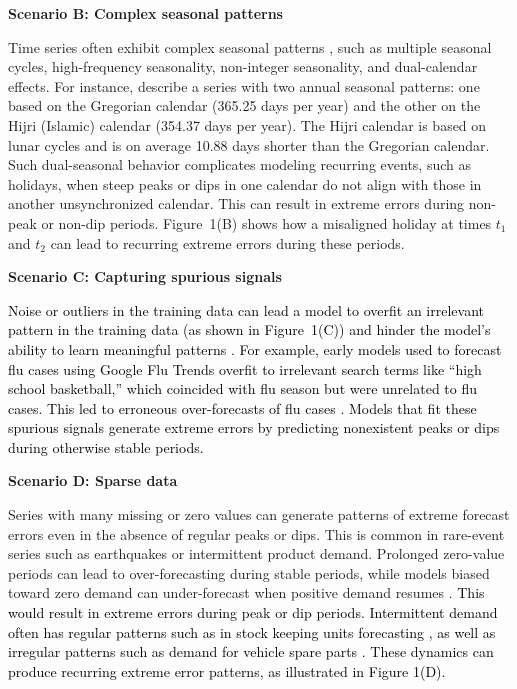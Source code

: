 \documentclass[]{interact}
\theoremstyle{plain}
\theoremstyle{definition}
\theoremstyle{remark}
\newenvironment{scenario}[1]{%
  \par\vspace{1ex}\noindent\textbf{#1}\par\vspace{0.5ex}}{\par}
\newcommand{\matt}[1]{\textcolor{black}{#1}}
\begin{document}
\begin{scenario}{Scenario B: Complex seasonal patterns}
Time series often exhibit complex seasonal patterns \citep{zhao2024}, such as multiple
seasonal cycles, high-frequency seasonality, non-integer seasonality, and dual-calendar
effects. For instance, \cite{delivera2011} describe a series with two annual seasonal
patterns: one based on the Gregorian calendar (365.25 days per year) and the other on the
Hijri (Islamic) calendar (354.37 days per year). The Hijri calendar is based on lunar cycles
and is on average 10.88 days shorter than the Gregorian calendar. Such dual-seasonal
behavior complicates modeling recurring events, such as holidays, when steep peaks or dips
in one calendar do not align with those in another unsynchronized calendar. This can result
in extreme errors during non-peak or non-dip periods. Figure~1(B) shows how a misaligned
holiday at times $t_1$ and $t_2$ can lead to recurring extreme errors during these periods.
\end{scenario}

\begin{scenario}{Scenario C: Capturing spurious signals}
\matt{Noise or outliers in the training data can lead a model to overfit an irrelevant
pattern in the training data (as shown in Figure~1(C)) and hinder the model's ability to
learn meaningful patterns \citep{cakmak2024}. For example, early models used to forecast flu
cases using Google Flu Trends overfit to irrelevant search terms like ``high school
basketball,'' which coincided with flu season but were unrelated to flu cases. This led to
erroneous over-forecasts of flu cases \citep{lazer2014}. Models that fit these spurious
signals generate extreme errors by predicting nonexistent peaks or dips during otherwise
stable periods.}
\end{scenario}

\begin{scenario}{Scenario D: Sparse data}
Series with many missing or zero values can generate patterns of extreme forecast errors even in the absence of regular peaks or dips. This is common in rare-event series such as
earthquakes or intermittent product demand. Prolonged zero-value periods can lead to
over-forecasting during stable periods, while models biased toward zero demand can
under-forecast when positive demand resumes \citep{wang2024b}. \matt{This would result in
extreme errors during peak or dip periods. Intermittent demand often has regular patterns
such as in stock keeping units forecasting \citep{nikolopoulos2021}, as well as irregular
patterns such as demand for vehicle spare parts \citep{jiang2021}. These dynamics can
produce recurring extreme error patterns, as illustrated in Figure 1(D).}
\end{scenario}
\end{document}
